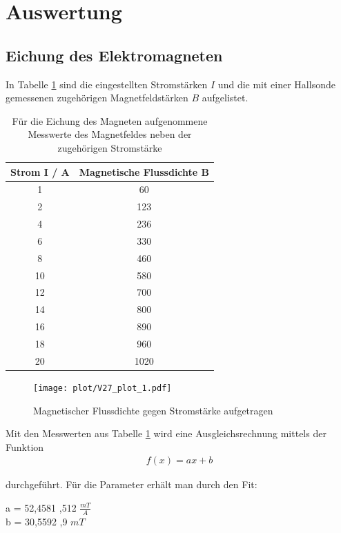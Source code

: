 \section{Auswertung}
\label{sec:Auswertung}




  \subsection{Eichung des Elektromagneten}
  In Tabelle \ref{tab:mit} sind die eingestellten Stromstärken $I$ und die mit einer Hallsonde gemessenen zugehörigen Magnetfeldstärken $B$ aufgelistet.
  
  \begin{table}[H] 
	\centering
	\caption{Für die Eichung des Magneten aufgenommene Messwerte des Magnetfeldes neben der zugehörigen Stromstärke} 
	\begin{tabular}{c|c}

Strom I / A & Magnetische Flussdichte B \\ 
\hline 
1	& 60 \\
2	& 123 \\
4	& 236\\
6	& 330\\
8	& 460\\
10	& 580\\
12	& 700\\
14	& 800\\
16	& 890\\
18	& 960\\
20	& 1020\\	
		
	\end{tabular} 
	  \label{tab:mit}
\end{table} 

\begin{figure}[h]
	\centering
	\texttt{[image: plot/V27\_plot\_1.pdf]}
	\caption{Magnetischer Flussdichte gegen Stromstärke aufgetragen}
	\label{plot:1}
\end{figure}

Mit den Messwerten aus Tabelle \ref{tab:mit} wird eine Ausgleichsrechnung mittels der Funktion 
\begin{align}
f(x)= ax+b
\end{align}

durchgeführt. Für die Parameter erhält man durch den Fit:

\begin{center}
a = 52,4581 ,512 $\frac{mT}{A}$
\\
b = 30,5592 ,9 $mT$

\end{center}    



